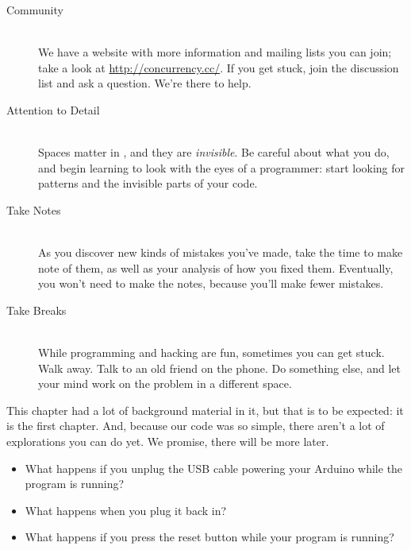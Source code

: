 \begin{description}
	\item[Community]\ \\ We have a website with more information and mailing lists you can join; take a look at \url{http://concurrency.cc/}. If you get stuck, join the discussion list and ask a question. We're there to help.
	\item[Attention to Detail]\ \\ Spaces matter in \plumbing, and they are {\em invisible}. Be careful about what you do, and begin learning to look with the eyes of a programmer: start looking for patterns and the invisible parts of your code.
	\item[Take Notes]\ \\ As you discover new kinds of mistakes you've made, take the time to make note of them, as well as your analysis of how you fixed them. Eventually, you won't need to make the notes, because you'll make fewer mistakes.
	\item[Take Breaks]\ \\ While programming and hacking are fun, sometimes you can get stuck. Walk away. Talk to an old friend on the phone. Do something else, and let your mind work on the problem in a different space.
\end{description}

\EXPLORATIONS
This chapter had a lot of background material in it, but that is to be expected: it is the first chapter. And, because our code was so simple, there aren't a lot of explorations you can do yet. We promise, there will be more later.

\begin{itemize}
	\item What happens if you unplug the USB cable powering your Arduino while the program is running? 
	\item What happens when you plug it back in?
	\item What happens if you press the reset button while your program is running?
\end{itemize}
